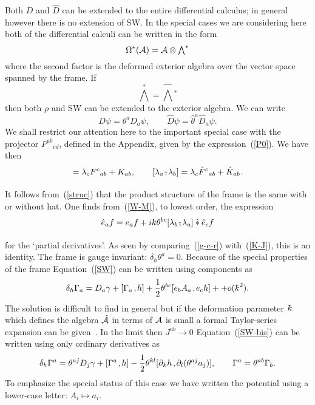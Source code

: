 \documentclass[a4paper,12pt]{article}
\def\h#1{\hat #1}
\def\p{\partial}
\def\c#1{{\cal #1}}
\def\kbar{{\mathchar'26\mkern-9muk}}
\def\hwm{\mathbin{\hat *}}
\def\k{\kern-.1em\mathbin{,}\kern-.1em}
\def\hk{\kern.12em\raise-1em\hbox{$\hat{\raise1em\hbox{,}}$}\kern.12em}
\begin{document}
Both $D$ and $\h{D}$ can be extended to the entire differential
calculus; in general however there is no extension of SW.  In the
special cases we are considering here both of the differential calculi
can be written in the form
$$
\Omega^*(\c{A}) = \c{A} \otimes \textstyle{\bigwedge}^*
$$
where the second factor is the deformed exterior algebra over the
vector space spanned by the frame. If
$$
\textstyle{\bigwedge}^* = \h{{\textstyle{\bigwedge}}}{}^*
$$
then both $\rho$ and SW can be extended to the exterior algebra.
We can write
$$
D \psi = \theta^a D_a \psi, \qquad 
\h{D} \psi = \h{\theta}^a \h{D}_a \psi.
$$
We shall restrict our attention here to the important special case
with the projector $P^{ab}{}_{cd}$, defined in the Appendix, given by
the expression~(\ref{P0}). We have then
\begin{equation}
[\lambda_a \k \lambda_b] = 
\lambda_c F^c{}_{ab} + K_{ab}, \qquad
[\lambda_a \hk \lambda_b] = 
\lambda_c \h{F}^c{}_{ab} + \h{K}_{ab}.                  \label{g-c-r}
\end{equation}
It follows from~(\ref{struc}) that the product structure of the frame
is the same with or without hat. One finds from~(\ref{W-M}), to lowest
order, the expression
$$
\h{e}_a f = e_a f + 
i\kbar \theta^{bc} [\lambda_b \hk \lambda_a] \hwm \h{e}_c f
$$
for the `partial derivatives'. As seen by comparing~(\ref{g-c-r})
with~(\ref{K-J}), this is an identity.  The frame is gauge invariant:
$\delta_h \theta^a = 0$.  Because of the special properties of the
frame Equation~(\ref{SW}) can be written using components as
\begin{equation}
\delta_h\Gamma_a = D_a \gamma + [\Gamma_a \k h] + 
\frac 12 \theta^{bc} [e_b A_a \k e_c h] + 
 + o(\kbar^2).                                               \label{SW-bis}
\end{equation}
The solution is difficult to find in general but if the deformation
parameter $\kbar$ which defines the algebra $\h{\c}{A}$ in terms of
$\c{A}$ is small a formal Taylor-series expansion can be
given~\cite{SeiWit99}.  In the limit then $J^{ab} \to 0$
Equation~(\ref{SW-bis}) can be written using only ordinary derivatives
as
\begin{equation}
\delta_h\Gamma^a = \theta^{aj} D_j \gamma + [\Gamma^a \k h] - 
\frac 12 \theta^{kl} [\p_k h \k \p_l (\theta^{aj} a_j)], 
\qquad \Gamma^a = \theta^{ab}\Gamma_b.                          \label{Wess}
\end{equation}
To emphasize the special status of this case we have written the
potential using a lower-case letter: $A_i \mapsto a_i$. 
\end{document}
